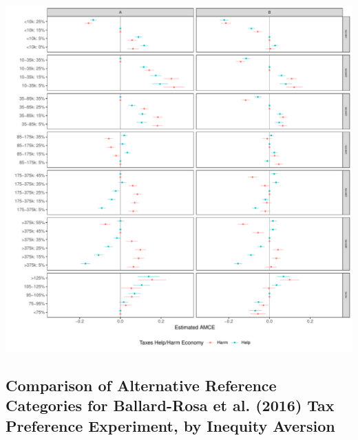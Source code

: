 \documentclass[a4paper,12pt]{article}\usepackage[]{graphicx}\usepackage[]{color}
\makeatletter
\def\maxwidth{ %
  \ifdim\Gin@nat@width>\linewidth
    \linewidth
  \else
    \Gin@nat@width
  \fi
}
\newenvironment{knitrout}{}{} %
\makeatother
\begin{document}
\begin{knitrout}
\color{fgcolor}
\includegraphics[width=\maxwidth]{figure/bms_subgroup_example_plot1-1} 

\end{knitrout}

\clearpage

\subsection{Comparison of Alternative Reference Categories for Ballard-Rosa et al. (2016) Tax Preference Experiment, by Inequity Aversion}
\end{document}
